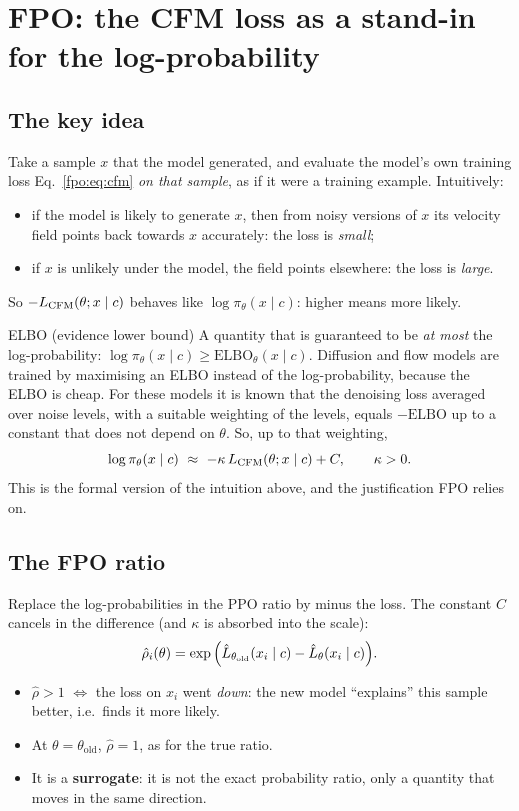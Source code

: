 \section{FPO: the CFM loss as a stand-in for the log-probability}\label{fpo:sec:fpo}

\subsection{The key idea}
Take a sample $x$ that the model generated, and evaluate the model's own training loss Eq.~\eqref{fpo:eq:cfm} \emph{on that sample}, as if it were a training example. Intuitively:
\begin{itemize}
\item if the model is likely to generate $x$, then from noisy versions of $x$ its velocity field points back towards $x$ accurately: the loss is \emph{small};
\item if $x$ is unlikely under the model, the field points elsewhere: the loss is \emph{large}.
\end{itemize}
So $-L_{\mathrm{CFM}}(\theta;x\mid c)$ behaves like $\log\pi_\theta(x\mid c)$: higher means more likely.

\begin{newc}{ELBO (evidence lower bound)}
A quantity that is guaranteed to be \emph{at most} the log-probability: $\log\pi_\theta(x\mid c)\ge\mathrm{ELBO}_\theta(x\mid c)$. Diffusion and flow models are trained by maximising an ELBO instead of the log-probability, because the ELBO is cheap. For these models it is known that the denoising loss averaged over noise levels, with a suitable weighting of the levels, equals $-\mathrm{ELBO}$ up to a constant that does not depend on $\theta$. So, up to that weighting,
\[\log\pi_\theta(x\mid c)\ \approx\ -\kappa\,\Lc(\theta;x\mid c)+C,\qquad\kappa>0.\]
This is the formal version of the intuition above, and the justification FPO relies on.
\end{newc}

\subsection{The FPO ratio}
Replace the log-probabilities in the PPO ratio by minus the loss. The constant $C$ cancels in the difference (and $\kappa$ is absorbed into the scale):
\begin{equation}
\hat\rho_i(\theta)=\exp\Big(\hat L_{\theta_{\mathrm{old}}}(x_i\mid c)-\hat L_{\theta}(x_i\mid c)\Big).
\label{fpo:eq:fporatio}
\end{equation}
\begin{itemize}
\item $\hat\rho>1$ $\Leftrightarrow$ the loss on $x_i$ went \emph{down}: the new model ``explains'' this sample better, i.e.\ finds it more likely.
\item At $\theta=\theta_{\mathrm{old}}$, $\hat\rho=1$, as for the true ratio.
\item It is a \textbf{surrogate}: it is not the exact probability ratio, only a quantity that moves in the same direction.
\end{itemize}

